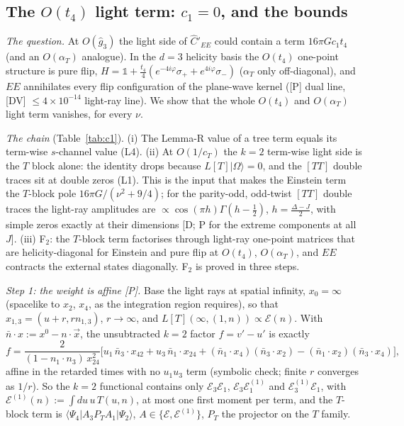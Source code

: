 \documentclass[aps,prl,onecolumn,superscriptaddress,nofootinbib]{revtex4-2}
\begin{document}
\subsection{The \texorpdfstring{$O(t_4)$}{O(t4)} light term: \texorpdfstring{$c_1=0$}{c1 = 0}, and the bounds}
\label{sec:c1}
\emph{The question.} At $O(\hat g_3)$ the light side of $\hat C'_{EE}$ could contain a term $16\pi Gc_1t_4$ (and an $O(\alpha_T)$
analogue). In the $d=3$ helicity basis the $O(t_4)$ one-point structure is pure flip,
$H=\mathbb 1+\tfrac{t_4}4(e^{-4i\varphi}\sigma_++e^{4i\varphi}\sigma_-)$ ($\alpha_T$ only off-diagonal), and $EE$ annihilates every flip
configuration of the plane-wave kernel ([P] dual line, [DV] $\le4\times10^{-14}$ light-ray line). We show that the whole $O(t_4)$ and
$O(\alpha_T)$ light term vanishes, for every $\nu$.

\emph{The chain} (Table~\ref{tab:c1}). (i) The Lemma-R value of a tree term equals its term-wise $s$-channel value (L4). (ii) At
$O(1/c_T)$ the $k=2$ term-wise light side is the $T$ block alone: the identity drops because $L[T]|\Omega\rangle=0$, and the $[TT]$
double traces sit at double zeros (L1). This is the input that makes the Einstein term the $T$-block pole $16\pi G/(\nu^2+9/4)$;
for the parity-odd, odd-twist $[TT]$ double traces the light-ray amplitudes are $\propto\cos(\pi h)\Gamma(h-\frac12)$, $h=\frac{\Delta-J}2$, with
simple zeros exactly at their dimensions [D; P for the extreme components at all $J$]. (iii) F$_2$: the $T$-block term factorises
through light-ray one-point matrices that are helicity-diagonal for Einstein and pure flip at $O(t_4)$, $O(\alpha_T)$, and $EE$
contracts the external states diagonally. F$_2$ is proved in three steps.

\emph{Step 1: the weight is affine [P].} Base the light rays at spatial infinity, $x_0=\infty$ (spacelike to $x_2$, $x_4$, as the
integration region requires), so that $x_{1,3}=(u+r,rn_{1,3})$, $r\to\infty$, and $L[T](\infty,(1,n))\propto\mathcal E(n)$. With
$\bar n\cdot x:=x^0-n\cdot\vec x$, the unsubtracted $k=2$ factor $f=v'-u'$ is exactly
\begin{equation}
f=\frac{2}{(1-n_1\cdot n_3)\,x_{24}^2}\big[u_1\,\bar n_3\cdot x_{42}+u_3\,\bar n_1\cdot x_{24}+(\bar n_1\cdot x_4)(\bar n_3\cdot x_2)-(\bar n_1\cdot x_2)(\bar n_3\cdot x_4)\big],
\end{equation}
affine in the retarded times with no $u_1u_3$ term (symbolic check; finite $r$ converges as $1/r$). So the $k=2$ functional contains
only $\mathcal E_3\mathcal E_1$, $\mathcal E_3\mathcal E_1^{(1)}$ and $\mathcal E_3^{(1)}\mathcal E_1$, with
$\mathcal E^{(1)}(n):=\int du\,u\,T(u,n)$, at most one first moment per term, and the $T$-block term is
$\langle\Psi_4|A_3P_TA_1|\Psi_2\rangle$, $A\in\{\mathcal E,\mathcal E^{(1)}\}$, $P_T$ the projector on the $T$ family.
\end{document}
